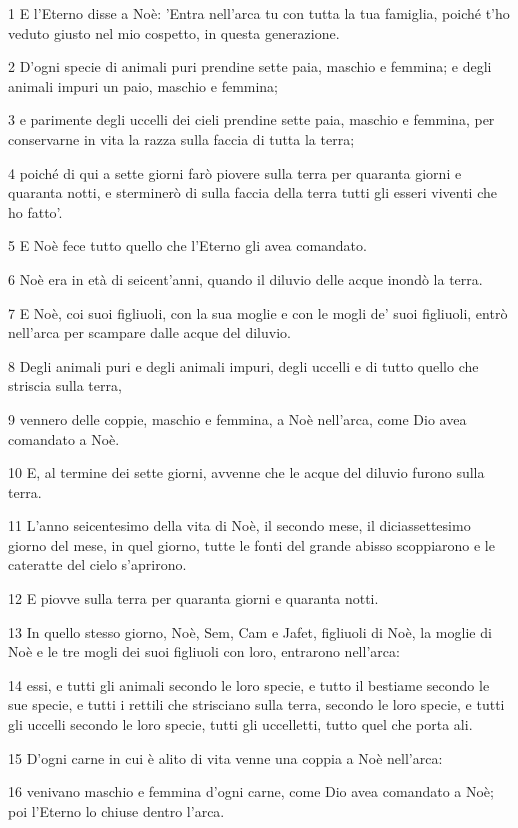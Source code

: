 \par 1 E l'Eterno disse a Noè: 'Entra nell'arca tu con tutta la tua famiglia, poiché t'ho veduto giusto nel mio cospetto, in questa generazione.
\par 2 D'ogni specie di animali puri prendine sette paia, maschio e femmina; e degli animali impuri un paio, maschio e femmina;
\par 3 e parimente degli uccelli dei cieli prendine sette paia, maschio e femmina, per conservarne in vita la razza sulla faccia di tutta la terra;
\par 4 poiché di qui a sette giorni farò piovere sulla terra per quaranta giorni e quaranta notti, e sterminerò di sulla faccia della terra tutti gli esseri viventi che ho fatto'.
\par 5 E Noè fece tutto quello che l'Eterno gli avea comandato.
\par 6 Noè era in età di seicent'anni, quando il diluvio delle acque inondò la terra.
\par 7 E Noè, coi suoi figliuoli, con la sua moglie e con le mogli de' suoi figliuoli, entrò nell'arca per scampare dalle acque del diluvio.
\par 8 Degli animali puri e degli animali impuri, degli uccelli e di tutto quello che striscia sulla terra,
\par 9 vennero delle coppie, maschio e femmina, a Noè nell'arca, come Dio avea comandato a Noè.
\par 10 E, al termine dei sette giorni, avvenne che le acque del diluvio furono sulla terra.
\par 11 L'anno seicentesimo della vita di Noè, il secondo mese, il diciassettesimo giorno del mese, in quel giorno, tutte le fonti del grande abisso scoppiarono e le cateratte del cielo s'aprirono.
\par 12 E piovve sulla terra per quaranta giorni e quaranta notti.
\par 13 In quello stesso giorno, Noè, Sem, Cam e Jafet, figliuoli di Noè, la moglie di Noè e le tre mogli dei suoi figliuoli con loro, entrarono nell'arca:
\par 14 essi, e tutti gli animali secondo le loro specie, e tutto il bestiame secondo le sue specie, e tutti i rettili che strisciano sulla terra, secondo le loro specie, e tutti gli uccelli secondo le loro specie, tutti gli uccelletti, tutto quel che porta ali.
\par 15 D'ogni carne in cui è alito di vita venne una coppia a Noè nell'arca:
\par 16 venivano maschio e femmina d'ogni carne, come Dio avea comandato a Noè; poi l'Eterno lo chiuse dentro l'arca.
